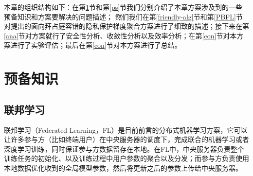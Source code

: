\begin{table}
	\centering
	\caption{Comparison with prior works on properties necessary for FL}
	\label{cmp}
\end{table}

本章的组织结构如下：在第\ref{bg}节和第\ref{ps}节我们分别介绍了本章方案涉及到的一些预备知识和方案要解决的问题描述；
然们我们在第\ref{friendly-alg}节和第\ref{PBFL}节对提出的面向拜占庭容错的隐私保护梯度聚合方案进行了细致的描述；接下来在第\ref{ana}节对方案就行了安全性分析、收敛性分析以及效率分析；在第\ref{con}节对本方案进行了实验评估；最后在第\ref{con}节对本方案进行了总结。

\section{预备知识}\label{bg}

\subsection{联邦学习}
联邦学习（Federated Learning，FL）是目前前言的分布式机器学习方案，它可以让许多参与方（比如终端用户）在中央服务器的调度下，完成联合的机器学习或者深度学习训练，同时保证参与方数据留存在本地。在FL中，中央服务器负责整个训练任务的初始化、以及训练过程中用户参数的聚合以及分发；而参与方负责使用本地数据优化收到的全局模型参数，然后将更新之后的参数上传给中央服务器。

